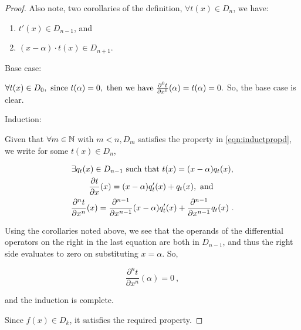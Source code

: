 \begin{alphaparts}
\begin{proof}
            Also note, two corollaries of the definition, \(\forall t(x) \in
            D_n\), we have:

            \begin{enumerate}
                \item \(t'(x) \in D_{n-1}\), and
                \item \((x-\alpha)\cdot t(x) \in D_{n+1}\).
            \end{enumerate}

            Base case:
            
            \(\forall t(x) \in D_0, \textnormal{ since } t(\alpha) = 0,
            \textnormal{ then we have } \frac{\partial^0 t}{\partial x^0}(\alpha)
            = t(\alpha) = 0.\) So, the base case is clear.

            Induction:

            Given that \(\forall m \in \mathbb{N}\) with \(m < n, D_m\) satisfies
            the property in \autoref{eqn:inductpropd}, we write for some \(t(x)
            \in D_n\),

            \begin{gather}
                \exists q_t(x) \in D_{n-1} \textnormal{ such that } t(x) = (x-\alpha)q_t(x),\\ 
                \frac{\partial t}{\partial x}(x) = (x-\alpha)q_t'(x) + q_t(x),  \textnormal{ and } \\
                \frac{\partial^n t}{\partial x^n}(x) = \frac{\partial^{n-1}}{\partial x^{n-1}}(x-\alpha)q_t'(x) + \frac{\partial^{n-1}}{\partial x^{n-1}}q_t(x)~.
            \end{gather}

            Using the corollaries noted above, we see that the operands of the
            differential operators on the right in the last equation are both in
            \(D_{n-1}\), and thus the right side evaluates to zero on
            substituting \(x = \alpha\). So, 
            
            \begin{equation}
                \frac{\partial^n t}{\partial x^n}(\alpha) = 0~,
            \end{equation}

            and the induction is complete.

            Since \(f(x) \in D_k\), it satisfies the required property.

        \end{proof}


\end{alphaparts}
